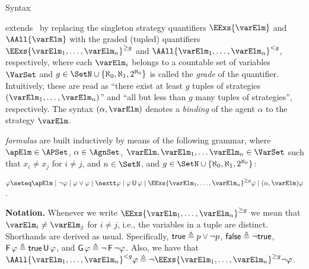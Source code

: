 	\begin{subsection}{Syntax}
	
		\GSLT extends \SL\ by replacing the singleton strategy quantifiers
		$\EExs{\varElm}$ and $\AAll{\varElm}$ with the graded
		(tupled) quantifiers $\EExs{\varElm_{1},\ldots, \varElm_{n}}^{\geq g}$ and
		$\AAll{\varElm_{1},\ldots, \varElm_{n}}^{< g}$, respectively, where each
		$\varElm_{i}$ belongs to a countable set of variables $\VarSet$
		and $g \in \SetN \cup \{\aleph_0, \aleph_1, 2^{\aleph_0}\}$ is called the \emph{grade} of the quantifier.
		Intuitively, these are read as ``there
		exist at least $g$ tuples of strategies $(\varElm_{1},\ldots,
		\varElm_{n})$'' and ``all but less than $g$ many tuples of strategies'',
		respectively. The syntax $(\alpha, \varElm)$ denotes a \emph{binding} of the agent $\alpha$ to the strategy $\varElm$.
		
		\begin{definition}
			\GSLT \emph{formulas} are built inductively by means of the following
			grammar, where $\apElm \in \APSet$, $\alpha \in \AgnSet$,
			$\varElm,\varElm_1, \dots \varElm_n \in \VarSet$ such that $x_i \neq x_j$ for $i \neq j$,
			and $n \in \SetN$, and $g \in \SetN \cup \{\aleph_0, \aleph_1, 2^{\aleph_0}\}$:
			\begin{center}
				$\varphi \seteq
				\apElm \mid
				\neg \varphi
				\mid \varphi \vee \varphi
				\mid \nextt \varphi
				\mid \varphi \until \varphi
				\mid \EExs{\varElm_{1},\ldots, \varElm_{n}}^{\geq g} \varphi
				\mid (\alpha, \varElm) \varphi$.
			\end{center}
		\end{definition}
		
	
	
		{\bf Notation.} Whenever we write $\EExs{\varElm_{1},\ldots, \varElm_{n}}^{\geq g}$
		we mean that $\varElm_i \neq \varElm_j$ for $i \neq j$, i.e., the variables in a tuple are distinct. Shorthands are derived as usual.
		Specifically, $\mathsf{true} \triangleq p \vee \neg p$, $\mathsf{false} \triangleq \neg \mathsf{true}$,
$\operatorname{\mathsf{F}} \varphi \triangleq \mathsf{true} \operatorname{\mathbin{\mathsf{U}}} \varphi$, and
		$\operatorname{\mathsf{G}} \varphi \triangleq
		\neg \operatorname{\mathsf{F}} \neg \varphi$. %
		Also, we have that $\AAll{\varElm_{1},\ldots, \varElm_{n}}^{< g}
		\varphi \defeq \neg \EExs{\varElm_{1},\ldots, \varElm_{n}}^{\geq g}
		\neg\varphi$.
		

\end{subsection}
